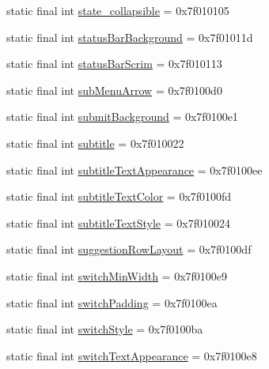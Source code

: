 \begin{CompactItemize}
\item 
static final int \hyperlink{classandroid_1_1support_1_1coreutils_1_1_r_1_1attr_d60d2728fe34e2af4bcfc67e49d1407d}{state\_\-collapsible} = 0x7f010105
\item 
static final int \hyperlink{classandroid_1_1support_1_1coreutils_1_1_r_1_1attr_7af97448475ee91f5769a28c2de7ab8c}{statusBarBackground} = 0x7f01011d
\item 
static final int \hyperlink{classandroid_1_1support_1_1coreutils_1_1_r_1_1attr_3fe7bf556d6c28c175bafd4e3da42d2f}{statusBarScrim} = 0x7f010113
\item 
static final int \hyperlink{classandroid_1_1support_1_1coreutils_1_1_r_1_1attr_49e58778169bbf4b0c25408fad60e803}{subMenuArrow} = 0x7f0100d0
\item 
static final int \hyperlink{classandroid_1_1support_1_1coreutils_1_1_r_1_1attr_8f99d7a564048820f8e2628e96411612}{submitBackground} = 0x7f0100e1
\item 
static final int \hyperlink{classandroid_1_1support_1_1coreutils_1_1_r_1_1attr_59bcdd8fc9f88111cb1ef3d97ffd90ed}{subtitle} = 0x7f010022
\item 
static final int \hyperlink{classandroid_1_1support_1_1coreutils_1_1_r_1_1attr_106d8ce543af3a3e78981ff67cc41a65}{subtitleTextAppearance} = 0x7f0100ee
\item 
static final int \hyperlink{classandroid_1_1support_1_1coreutils_1_1_r_1_1attr_5946f88f8f119ddae6c8bdcd06bbb4c2}{subtitleTextColor} = 0x7f0100fd
\item 
static final int \hyperlink{classandroid_1_1support_1_1coreutils_1_1_r_1_1attr_53f4782656ff8506c8ad862b87753a16}{subtitleTextStyle} = 0x7f010024
\item 
static final int \hyperlink{classandroid_1_1support_1_1coreutils_1_1_r_1_1attr_54ca8726abdd8d69fb2b261faf556d93}{suggestionRowLayout} = 0x7f0100df
\item 
static final int \hyperlink{classandroid_1_1support_1_1coreutils_1_1_r_1_1attr_abf7bae3a8dc5ca218cebc18581b40d0}{switchMinWidth} = 0x7f0100e9
\item 
static final int \hyperlink{classandroid_1_1support_1_1coreutils_1_1_r_1_1attr_9ab4db579fd2012ecf379ea022ac487a}{switchPadding} = 0x7f0100ea
\item 
static final int \hyperlink{classandroid_1_1support_1_1coreutils_1_1_r_1_1attr_4a13474418706dbbf4eeffa69009540f}{switchStyle} = 0x7f0100ba
\item 
static final int \hyperlink{classandroid_1_1support_1_1coreutils_1_1_r_1_1attr_25a584259c0a6d3f2b9a2ee7894f070e}{switchTextAppearance} = 0x7f0100e8

\end{CompactItemize}
